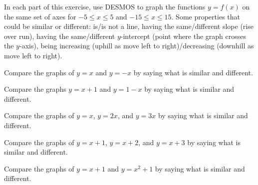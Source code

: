 \begin{exer} [\exerE] %
\label{exer_desmos_lines}
    In each part of this exercise, use {DESMOS\texttrademark} to graph the functions $y =f(x)$ on the same set of axes for $-5 \le x \le 5$ and $-15 \le x \le 15$.  Some properties that could be similar or different:  is/is not a line, having the same/different slope (rise over run), having the same/different $y$-intercept (point where the graph crosses the $y$-axis), being increasing (uphill as move left to right)/decreasing (downhill as move left to right).
    \begin{exerpart}
        \item Compare the graphs of $y=x$ and $y = -x$ by saying what is similar and different. 
        \item Compare the graphs $y = x+1$ and $y = 1-x$ by saying what is similar and different. 
        \item Compare the graphs of $y=x$, $y=2x$, and $y=3x$ by saying what is similar and different.      
        \item Compare the graphs of $y = x+1$, $y = x+2$, and $y = x+3$ by saying what is similar and different. 
        \item Compare the graphs of $y=x+1$ and $y = x^2+1$ by saying what is similar and different. 
    \end{exerpart}
\end{exer}


